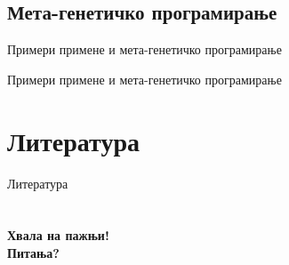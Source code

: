 \documentclass{beamer}
\begin{document}
\subsection[Мета-генетичко програмирање]{Мета-генетичко програмирање}

    \begin{frame}{Примери примене и мета-генетичко програмирање}
    \end{frame}
    
    \begin{frame}{Примери примене и мета-генетичко програмирање}
    \end{frame}
    
\section{Литература}
    \begin{frame}{Литература}
        \nocite{*}
        \printbibliography
    \end{frame}
    
\section{}
\begin{frame}{}
    \centering
    \Huge\bfseries{Хвала на пажњи!\\ Питања?}
\end{frame}
\end{document}
